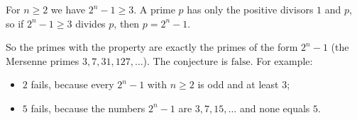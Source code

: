 For $n\ge2$ we have $2^n-1\ge3$. A prime $p$ has only the positive divisors $1$ and $p$, so if $2^n-1\ge3$ divides $p$, then $p=2^n-1$.

So the primes with the property are exactly the primes of the form $2^n-1$ (the Mersenne primes $3,7,31,127,\dots$). The conjecture is $\boxed{\text{false}}$. For example:
\begin{itemize}
\item $2$ fails, because every $2^n-1$ with $n\ge2$ is odd and at least $3$;
\item $5$ fails, because the numbers $2^n-1$ are $3,7,15,\dots$ and none equals $5$.
\end{itemize}
